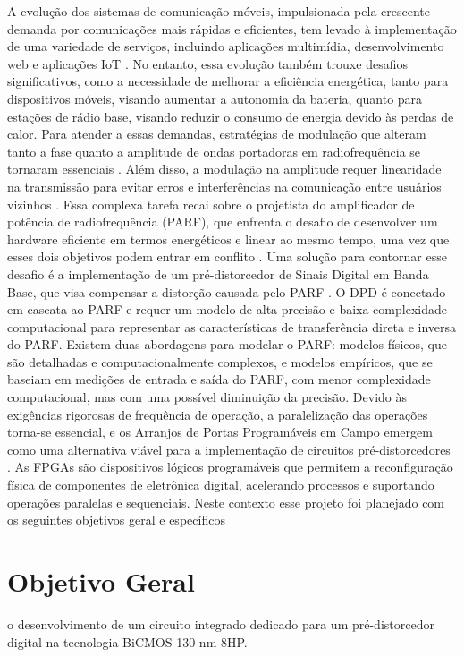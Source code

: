 A evolução dos sistemas de comunicação móveis, impulsionada pela crescente demanda por
comunicações mais rápidas e eficientes, tem levado à implementação de uma variedade de serviços,
incluindo aplicações multimídia, desenvolvimento web e aplicações IoT \cite{John2016}. No entanto, essa
evolução também trouxe desafios significativos, como a necessidade de melhorar a eficiência
energética, tanto para dispositivos móveis, visando aumentar a autonomia da bateria, quanto para
estações de rádio base, visando reduzir o consumo de energia devido às perdas de calor.
Para atender a essas demandas, estratégias de modulação que alteram tanto a fase quanto a
amplitude de ondas portadoras em radiofrequência se tornaram essenciais \cite{Kenington2000}. Além disso, a
modulação na amplitude requer linearidade na transmissão para evitar erros e interferências na
comunicação entre usuários vizinhos \cite{Cripps2006}. Essa complexa tarefa recai sobre o projetista do
amplificador de potência de radiofrequência (PARF), que enfrenta o desafio de desenvolver um
hardware eficiente em termos energéticos e linear ao mesmo tempo, uma vez que esses dois objetivos
podem entrar em conflito \cite{Chavez2018}.
Uma solução para contornar esse desafio é a implementação de um pré-distorcedor de Sinais
Digital em Banda Base, que visa compensar a distorção causada pelo PARF \cite{Cripps2006}. O DPD é conectado
em cascata ao PARF e requer um modelo de alta precisão e baixa complexidade computacional para
representar as características de transferência direta e inversa do PARF. Existem duas abordagens
para modelar o PARF: modelos físicos, que são detalhadas e computacionalmente complexos, e
modelos empíricos, que se baseiam em medições de entrada e saída do PARF, com menor
complexidade computacional, mas com uma possível diminuição da precisão.
Devido às exigências rigorosas de frequência de operação, a paralelização das operações
torna-se essencial, e os Arranjos de Portas Programáveis em Campo emergem como uma
alternativa viável para a implementação de circuitos pré-distorcedores \cite{Pedroni2010}. As FPGAs são dispositivos
lógicos programáveis que permitem a reconfiguração física de componentes de eletrônica digital,
acelerando processos e suportando operações paralelas e sequenciais. Neste contexto esse projeto foi planejado com os seguintes objetivos geral e específicos

\section{Objetivo Geral}
o desenvolvimento de um circuito integrado dedicado para um pré-distorcedor digital na tecnologia BiCMOS 130 nm 8HP.

